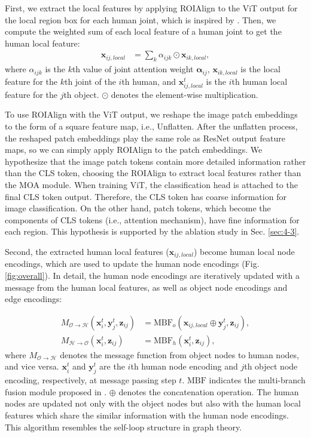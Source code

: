 \documentclass[10pt,twocolumn,letterpaper]{article}
\begin{document}
First, we extract the local features by applying ROIAlign to the ViT output for the local region box for each human joint, which is inspired by \cite{wan2019pose}. Then, we compute the weighted sum of each local feature of a human joint to get the human local feature:
\begin{align}
\label{eq:5}
    \mathbf{x}_{ij,local} &= \sum_{k}{\alpha_{ijk} \odot \mathbf{x}_{ik,local}},
\end{align}
where $\alpha_{ijk}$ is the $k$th value of joint attention weight $\boldsymbol{\alpha}_{ij}$, $\mathbf{x}_{ik, local}$ is the local feature for the $k$th joint of the $i$th human, and $\mathbf{x}^{t}_{ij,local}$ is the $i$th human local feature for the $j$th object. $\odot$ denotes the element-wise multiplication.

To use ROIAlign with the ViT output, we reshape the image patch embeddings to the form of a square feature map, i.e., Unflatten. After the unflatten process, the reshaped patch embeddings play the same role as ResNet output feature maps, so we can simply apply ROIAlign to the patch embeddings. We hypothesize that the image patch tokens contain more detailed information rather than the CLS token, choosing the ROIAlign to extract local features rather than the MOA module. When training ViT, the classification head is attached to the final CLS token output. Therefore, the CLS token has coarse information for image classification. On the other hand, patch tokens, which become the components of CLS tokens (i.e., attention mechanism), have fine information for each region. This hypothesis is supported by the ablation study in Sec. \ref{sec:4-3}.


Second, the extracted human local features ($\mathbf{x}_{ij,local}$) become human local node encodings, which are used to update the human node encodings (Fig. \ref{fig:overall}). In detail, the human node encodings are iteratively updated with a message from the human local features, as well as object node encodings and edge encodings:

\begin{align}
    \label{eq:2}
    M_{\mathcal{O} \rightarrow \mathcal{H}}(\mathbf{x}^{t}_{i}, \mathbf{y}^{t}_{j}, \mathbf{z}_{ij}) &=  \textrm{MBF}_{o}(\mathbf{x}_{ij,local} \oplus \mathbf{y}^{t}_{j},\mathbf{z}_{ij}), \\
    \label{eq:3}
    M_{\mathcal{H} \rightarrow \mathcal{O}}(\mathbf{x}^{t}_{i}, \mathbf{z}_{ij}) &=  \textrm{MBF}_{h}(\mathbf{x}^{t}_{i},\mathbf{z}_{ij}),
\end{align}
where $M_{\mathcal{O} \rightarrow \mathcal{H}}$ denotes the message function from object nodes to human nodes, and vice versa. $\mathbf{x}^{t}_{i}$ and $\mathbf{y}^{t}_{j}$ are the $i$th human node encoding and  $j$th object node encoding, respectively, at message passing step $t$. $\textrm{MBF}$ indicates the multi-branch fusion module proposed in \cite{zhang2021spatially}. $\oplus$ denotes the concatenation operation. The human nodes are updated not only with the object nodes but also with the human local features which share the similar information with the human node encodings. This algorithm resembles the self-loop structure in graph theory.
\end{document}
